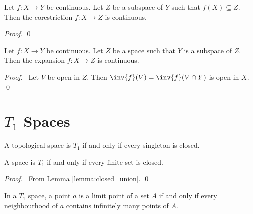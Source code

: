 \begin{theorem}
    Let $f : X \rightarrow Y$ be continuous. Let $Z$ be a subspace of $Y$ such that $f(X) \subseteq Z$. Then
    the corestriction $f : X \rightarrow Z$ is continuous.
\end{theorem}

\begin{proof}
    \pf
    \qed
\end{proof}

\begin{theorem}
    Let $f : X \rightarrow Y$ be continuous. Let $Z$ be a space such that $Y$ is a subspace of $Z$.
    Then the expansion $f : X \rightarrow Z$ is continuous.
\end{theorem}

\begin{proof}
    \pf\ Let $V$ be open in $Z$. Then $\inv{f}(V) = \inv{f}(V \cap Y)$ is open in $X$. \qed
\end{proof}

\section{$T_1$ Spaces}

\begin{definition}[$T_1$ Space]
    A topological space is $T_1$ if and only if every singleton is closed.
\end{definition}

\begin{lemma}
    A space is $T_1$ if and only if every finite set is closed.
\end{lemma}

\begin{proof}
    \pf\ From Lemma \ref{lemma:closed_union}. \qed
\end{proof}

\begin{theorem}
    \label{theorem:limit_point_T1}
    In a $T_1$ space, a point $a$ is a limit point of a set $A$ if and only if every neighbourhood of $a$
    contains infinitely many points of $A$.
\end{theorem}


